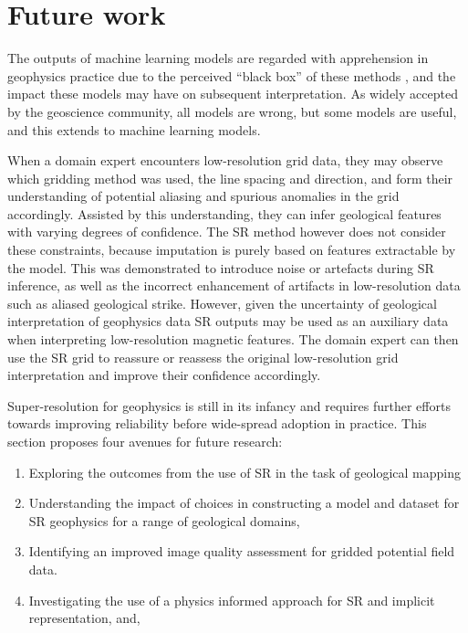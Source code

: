 \documentclass[manuscript.tex]{subfiles}
\begin{document}
\setcounter{chapter}{4}

\chapter{Future work}
\label{ch:futurework}
The outputs of machine learning models are regarded with apprehension in geophysics practice due to the perceived “black box” of these methods \parencite{delaatAlgorithmicDecisionMakingBased2018,rudinStopExplainingBlack2019}, and the impact these models may have on subsequent interpretation.
As widely accepted by the geoscience community, all models are wrong, but some models are useful, and this extends to machine learning models.

When a domain expert encounters low-resolution grid data, they may observe which gridding method was used, the line spacing and direction, and form their understanding of potential aliasing and spurious anomalies in the grid accordingly.
Assisted by this understanding, they can infer geological features with varying degrees of confidence.
The SR method however does not consider these constraints, because imputation is purely based on features extractable by the model.
This was demonstrated to introduce noise or artefacts during SR inference, as well as the incorrect enhancement of artifacts in low-resolution data such as aliased geological strike.
However, given the uncertainty of geological interpretation of geophysics data \parencite{sivarajahIdentifyingEffectiveInterpretation2013} SR outputs may be used as an auxiliary data when interpreting low-resolution magnetic features.
The domain expert can then use the SR grid to reassure or reassess the original low-resolution grid interpretation and improve their confidence accordingly.

Super-resolution for geophysics is still in its infancy and requires further efforts towards improving reliability before wide-spread adoption in practice.
This section proposes four avenues for future research:
\begin{enumerate}
    \item{} Exploring the outcomes from the use of SR in the task of geological mapping
    \item{} Understanding the impact of choices in constructing a model and dataset for SR geophysics for a range of geological domains,
    \item{} Identifying an improved image quality assessment for gridded potential field data.
    \item{} Investigating the use of a physics informed approach for SR and implicit representation, and,
\end{enumerate}
\end{document}
